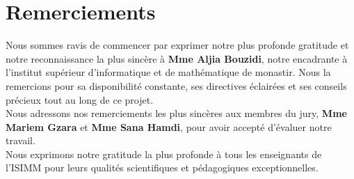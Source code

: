 \thispagestyle{empty}

\chapter*{Remerciements}

Nous sommes ravis de commencer par exprimer notre plus profonde gratitude et notre reconnaissance la plus sincère à \textbf{Mme Aljia Bouzidi}, notre encadrante à l'institut supérieur d'informatique et de mathématique de monastir. Nous la remercions pour sa disponibilité constante, ses directives éclairées et ses conseils précieux tout au long de ce projet.\\

Nous adressons nos remerciements les plus sincères aux membres du jury, \textbf{Mme Mariem Gzara} et \textbf{Mme Sana Hamdi}, pour avoir accepté d'évaluer notre travail.\\

Nous exprimons notre gratitude la plus profonde à tous les enseignants de l'ISIMM pour leurs qualités scientifiques et pédagogiques exceptionnelles.